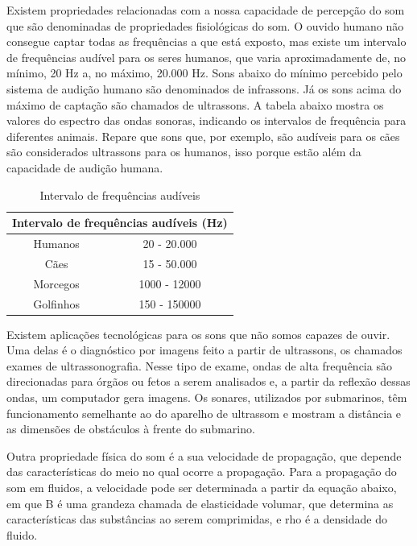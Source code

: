 Existem propriedades relacionadas com a nossa capacidade de percepção do som que são denominadas de propriedades fisiológicas do som. O ouvido humano não consegue captar todas as frequências a que está exposto, mas existe um intervalo de frequências audível para os seres humanos, que varia aproximadamente de, no mínimo, 20 Hz a, no máximo, 20.000 Hz. Sons abaixo do mínimo percebido pelo sistema de audição humano são denominados de infrassons. Já os sons acima do máximo de captação são chamados de ultrassons. A tabela abaixo mostra os valores do espectro das ondas sonoras, indicando os intervalos de frequência para diferentes animais. Repare que sons que, por exemplo, são audíveis para os cães são considerados ultrassons para os humanos, isso porque estão além da capacidade de audição humana.


\begin{table}[hb]
\centering
\begin{tabular}{|cc|}
\hline
\multicolumn{2}{|l|}{Intervalo de frequências audíveis (Hz)}                           \\ \hline
\multicolumn{1}{|c|}{Humanos} & \multicolumn{1}{c|}{20 - 20.000} \\ \hline
\multicolumn{1}{|c|}{Cães} & \multicolumn{1}{c|}{15 - 50.000} \\ \hline
\multicolumn{1}{|c|}{Morcegos} & \multicolumn{1}{c|}{1000 - 12000} \\ \hline
\multicolumn{1}{|c|}{Golfinhos} & \multicolumn{1}{c|}{150 - 150000} \\ \hline
\end{tabular}

\caption{Intervalo de frequências audíveis} 
\end{table}

Existem aplicações tecnológicas para os sons que não somos capazes de ouvir. Uma delas é o diagnóstico por imagens feito a partir de ultrassons, os chamados exames de ultrassonografia. Nesse tipo de exame, ondas de alta frequência são direcionadas para órgãos ou fetos a serem analisados e, a partir da reflexão dessas ondas, um computador gera imagens. Os sonares, utilizados por submarinos, têm funcionamento semelhante ao do aparelho de ultrassom e mostram a distância e as dimensões de obstáculos à frente do submarino.

Outra propriedade física do som é a sua velocidade de propagação, que depende das características do meio no qual ocorre a propagação. Para a propagação do som em fluidos, a velocidade pode ser determinada a partir da equação abaixo, em que B é uma grandeza chamada de elasticidade volumar, que determina as características das substâncias ao serem comprimidas, e rho é a densidade do fluido.

